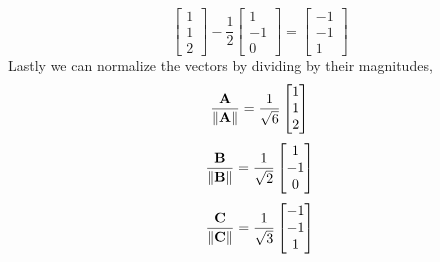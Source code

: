 \begin{mdframed}[style=MyFrame]
\begin{equation}
\begin{bmatrix}
            1       \\
            1       \\
            2
        \end{bmatrix}
        -
        \frac{1}{2}
        \begin{bmatrix}
            1       \\
            -1      \\
            0
        \end{bmatrix}
        =
        \begin{bmatrix}
            -1      \\
            -1      \\
            1
        \end{bmatrix}
    \end{equation}
    Lastly we can normalize the vectors by dividing by their magnitudes,
    \begin{equation}
        \frac{\mathbf{A}}{\norm{\mathbf{A}}} =
            \frac{1}{\sqrt{6}}
            \begin{bmatrix}
                1       \\
                1       \\
                2
            \end{bmatrix}
    \end{equation}
    \begin{equation}
        \frac{\mathbf{B}}{\norm{\mathbf{B}}} =
            \frac{1}{\sqrt{2}}
            \begin{bmatrix}
                1       \\
                -1      \\
                0
            \end{bmatrix}
    \end{equation}
    \begin{equation}
        \frac{\mathbf{C}}{\norm{\mathbf{C}}} =
            \frac{1}{\sqrt{3}}
            \begin{bmatrix}
                -1      \\
                -1      \\
                1
            \end{bmatrix}
    \end{equation}
\end{mdframed}
